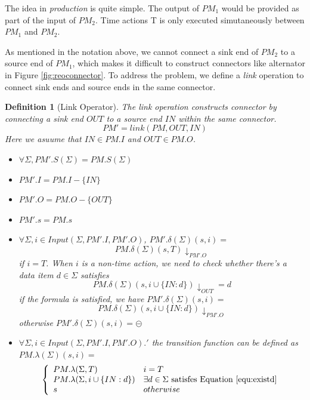 \documentclass[conference, a4paper]{IEEEtran}
\newtheorem{definition}{Definition}
\newcommand{\rblock}[0]{\circleddash}
\begin{document}
The idea in \emph{production} is quite simple. The output of $PM_1$ would be provided as part of the
input of $PM_2$. Time actions T is only executed simutaneously between $PM_1$ and $PM_2$.

As mentioned in the notation above, we cannot connect a sink end of $PM_2$ to a source end of
$PM_1$, which makes it difficult to construct connectors like alternator in Figure
\ref{fig:reoconnector}. To address the problem, we define a \emph{link} operation to connect sink
ends and source ends in the same connector.

\begin{definition}[Link Operator]
  The \emph{link} operation constructs connector by connecting a sink end $OUT$ to a source end $IN$
  within the same connector.   
  \[
  PM' = link(PM, OUT, IN)
  \]
  Here we asuume that $IN\in PM.I$ and $OUT\in PM.O$.

  \begin{itemize}
  	\item[-] $\forall\Sigma, PM'.S(\Sigma)=PM.S(\Sigma)$
    \item[-] $PM'.I=PM.I-\{IN\}$
    \item[-] $PM'.O=PM.O-\{OUT\}$
    \item[-] $PM'.s=PM.s$
    \item[-] $\forall\Sigma, i\in Input(\Sigma,PM'.I,PM'.O)$, $PM'.\delta(\Sigma)(s, i)=$
      \begin{equation}
        \label{equ:existd}
        PM.\delta(\Sigma)(s,T)\downarrow_{PM'.O}
      \end{equation}
      if $i=T$. When $i$ is a non-time action, we need to check whether there's a data item
      $d\in\Sigma$
      satisfies
      \[
      PM.\delta(\Sigma)(s,i\cup\{IN:d\})\downarrow_{OUT} = d
      \]
      if the formula is satisfied, we have $PM'.\delta(\Sigma)(s, i)=$
      \[
      PM.\delta(\Sigma)(s,i\cup\{IN:d\})\downarrow_{PM'.O}
      \]
      otherwise $PM'.\delta(\Sigma)(s, i)=\rblock$
    \item[-] $\forall\Sigma, i\in Input(\Sigma,PM'.I,PM'.O).'$ the transition
      function can be defined as $PM.\lambda(\Sigma)(s,i)=$
      \begin{displaymath}
        \left\{
        \begin{array}[ht]{ll}
          PM.\lambda(\Sigma,T) & i=T \\
          PM.\lambda(\Sigma,i\cup\{IN:d\}) & \exists d\in\Sigma \mbox{ satisfes Equation
          \ref{equ:existd}} \\
          s & otherwise \\
        \end{array}
        \right.
      \end{displaymath}
  \end{itemize}
\end{definition}
\end{document}
